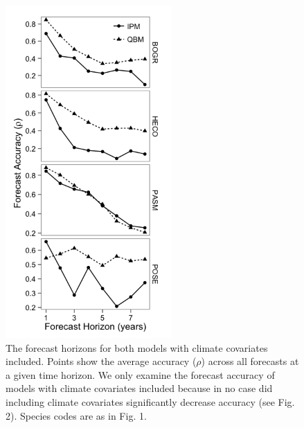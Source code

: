 \documentclass[12pt,]{article}
\begin{document}
\begin{figure}[!ht]
  \centering
      \includegraphics[height=5in]{./components/forecast_horizon.png}
  \caption{The forecast horizons for both models with climate covariates included. Points show the average accuracy ($\rho$) across all forecasts at a given time horizon. We only examine the forecast accuracy of models with climate covariates included because in no case did including climate covariates significantly decrease accuracy (see Fig. 2). Species codes are as in Fig. 1.}
\end{figure}
\end{document}
